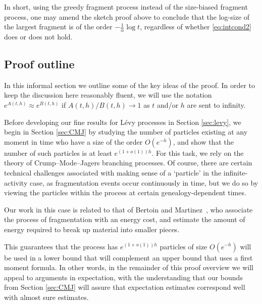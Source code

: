 \documentclass[a4,12pt]{amsart}
\numberwithin{equation}{section}
\begin{document}
    In short, using the greedy fragment process instead of the size-biased fragment process, one may amend the sketch proof above to conclude that the log-size of the largest fragment is of the order $-\frac{1}{\alpha}\log t$, regardless of whether \eqref{eq:intcond2} does or does not hold.

\subsection{Proof outline} \label{sec:outline} %
    
    In this informal section we outline some of the key ideas of the proof. In order to keep the discussion here reasonably fluent, we will use the notation $e^{A(t,h)} \approx e^{B(t,h)}$ if $A(t,h)/B(t,h) \to 1$ as $t$ and/or $h$ are sent to infinity. 
    
    Before developing our fine results for L\'evy processes in Section \ref{sec:levy}, we begin in Section \ref{sec:CMJ} by studying the number of particles existing at any moment in time who have a size of the order $O(e^{-h})$, and show that the number of such particles is at least $e^{ (1+o(1))h}$. 
    For this task, we rely on the theory of Crump–Mode–Jagers branching processes.
	Of course, there are certain technical challenges associated with making sense of a ‘particle’ 
	in the infinite-activity case, as fragmentation events occur continuously in time, but we do so by viewing the particles within the process at certain genealogy-dependent times.
    
	Our work in this case is related to that of Bertoin and Martinez~\cite{BM}, who associate 
	the process of fragmentation with an energy cost, and estimate the amount of energy required 
	to break up material into smaller pieces.

    
    This guarantees that the process has $e^{(1+o(1))h}$ particles of size $O(e^{-h})$ will be used in a lower bound that will complement an upper bound that uses a first moment formula. In other words, in the remainder of this proof overview we will appeal to arguments in expectation, with the understanding that our bounds from Section \ref{sec:CMJ} will assure that expectation estimates correspond well with almost sure estimates.
        
\end{document}
